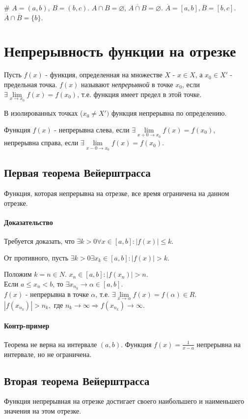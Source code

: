 \documentclass[10pt]{article}
\newcommand{\limx}[1]{\lim\limits_{x \to #1}}
\newcommand{\limxr}[1]{\lim\limits_{x-0 \to #1}}
\newcommand{\limxl}[1]{\lim\limits_{x+0 \to #1}}
\newcommand{\ol}[1]{\overline{#1}}
\begin{document}
				\# $A = (a, b)$, $B = (b, c)$. $A \cap B = \varnothing$, $\ol{A \cap B} = \varnothing$. $\ol{A} = [a, b], \ol{B} = [b, c]$. $\ol{A} \cap \ol{B} = \{b\}$.
	\section{Непрерывность функции на отрезке}
	Пусть $f(x)$ - функция, определенная на множестве $X$ - $x \in X$, а $x_0 \in X'$ - предельная точка. $f(x)$ называют \textit{непрерывной} в точке $x_0$, если $\exists \limx{x_0} f(x) = f(x_0)$, т.е. функция имеет предел в этой точке.
	
	В изолированных точках ($x_0 \neq X')$ функция непрерывна по определению.
	
	Функция $f(x)$ - непрерывна слева, если $\exists \limxl{x_0} f(x) = f(x_0)$, непрерывна справа, если $\exists \limxr{x_0} f(x) = f(x_0)$.
	
		\subsection{Первая теорема Вейерштрасса}
		Функция, которая непрерывна на отрезке, все время ограничена на данном отрезке.
		\paragraph{Доказательство}
		Требуется доказать, что $\exists k > 0 \forall x \in [a,b] : |f(x)| \leq k$.
		
		От противного, пусть $\exists k > 0 \exists x_k \in [a, b] : |f(x)| > k$.
		
		Положим $k = n \in N$. $x_n \in [a,b] : |f(x_n)| > n$.\\
		Если $a \leq x_n < b$, то $\exists x_{n_k} \to \alpha \in [a, b]$.\\
		$f(x)$ - непрерывна в точке $\alpha$, т.е. $\exists \limx{\alpha} f(x) = f(\alpha) \in R$.\\
		$|f(x_{n_k})| > n_k,$ где $n_k \to \infty \Rightarrow f(x_{n_k}) \to \infty$.
		
		\paragraph{Контр-пример}
		Теорема не верна на интервале $(a,b)$. Функция $f(x) = \frac{1}{x-a}$ непрерывна на интервале, но не ограничена.
		
		\subsection{Вторая теорема Вейерштрасса}
		Функция непрерывная на отрезке достигает своего наибольшего и наименьшего значения на этом отрезке.
\end{document}
